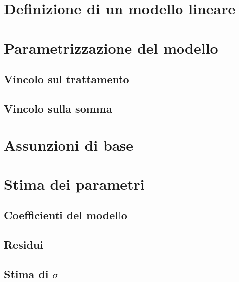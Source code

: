 \documentclass[a4paper,12pt,oneside]{book}
\begin{document}
\hypertarget{definizione-di-un-modello-lineare}{%
\section{Definizione di un modello lineare}\label{definizione-di-un-modello-lineare}}

\hypertarget{parametrizzazione-del-modello}{%
\section{Parametrizzazione del modello}\label{parametrizzazione-del-modello}}

\hypertarget{vincolo-sul-trattamento}{%
\subsection{Vincolo sul trattamento}\label{vincolo-sul-trattamento}}

\hypertarget{vincolo-sulla-somma}{%
\subsection{Vincolo sulla somma}\label{vincolo-sulla-somma}}

\hypertarget{assunzioni-di-base}{%
\section{Assunzioni di base}\label{assunzioni-di-base}}

\hypertarget{stima-dei-parametri}{%
\section{Stima dei parametri}\label{stima-dei-parametri}}

\hypertarget{coefficienti-del-modello}{%
\subsection{Coefficienti del modello}\label{coefficienti-del-modello}}

\hypertarget{residui}{%
\subsection{Residui}\label{residui}}

\hypertarget{stima-di-sigma}{%
\subsection{\texorpdfstring{Stima di \(\sigma\)}{Stima di \textbackslash{}sigma}}\label{stima-di-sigma}}
\end{document}
